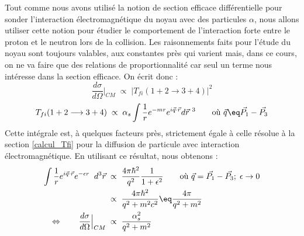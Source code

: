 Tout comme nous avons utilisé la notion de section efficace différentielle pour sonder l'interaction électromagnétique du noyau avec des particules $\alpha$, nous allons utiliser cette notion pour étudier le comportement de l'interaction forte entre le proton et le neutron lors de la collision. Les raisonnements faits pour l'étude du noyau sont toujours valables, aux constantes près qui varient mais, dans ce cours, on ne va faire que des relations de proportionnalité car seul un terme nous intéresse dans la section efficace. On écrit donc :
\begin{equation*}
    \dfrac{d\sigma}{d\Omega}\Big|_{CM} \; \propto \; |T_{fi}(1+2\longrightarrow3+4)|^2
\end{equation*}
\begin{equation*}
    T_{fi}(1+2\longrightarrow3+4)\; \propto \; \alpha_s \int \frac{1}{r}e^{-mr}e^{i\Vec{q}\cdot\Vec{r}}d\Vec{r}^{\ 3}
    \qquad \text{où }\Vec{q} \eq \Vec{P_1} - \Vec{P_3}
\end{equation*}
Cette intégrale est, à quelques facteurs près, strictement égale à celle résolue à la section \ref{calcul_Tfi} pour la diffusion de particule avec interaction électromagnétique. En utilisant ce résultat, nous obtenons :
\begin{align*}
    \int \frac{1}{r}e^{i\Vec{q}\cdot\Vec{r}}e^{-\epsilon r} \;\;d^3\Vec{r}
    &\;\propto\; 
    \frac{4\pi\hbar^2}{q^2}\frac{1}{1+\epsilon^2} \qquad \text{où }\Vec{q} 
    = \Vec{P_1} - \Vec{P_3}; \; \epsilon \rightarrow 0\\
    &\;\propto\; 
    \frac{4\pi\hbar^2}{q^2+m^2c^2}
    \eq \frac{4\pi}{q^2+m^2}\\
    \Leftrightarrow \qquad 
    \dfrac{d\sigma}{d\Omega}\Big|_{CM} 
    &\; \propto \; \frac{\alpha_s^2}{q^2 + m^2}
\end{align*}

